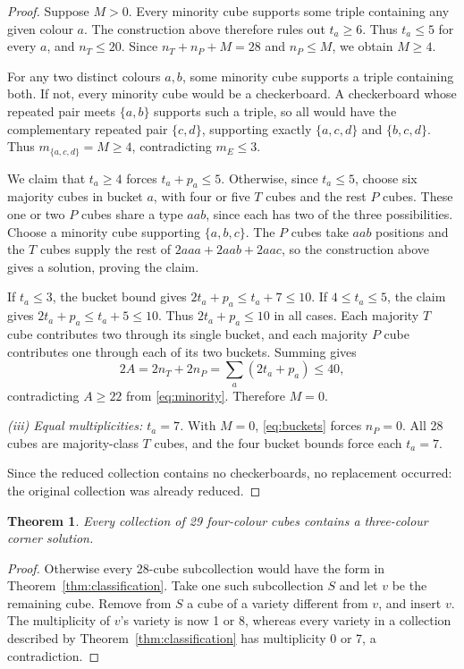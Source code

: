\documentclass[11pt]{article}
\newtheorem{theorem}{Theorem}
\theoremstyle{remark}
\begin{document}
\begin{proof}
Suppose $M>0$. Every minority cube supports some triple containing any
given colour $a$. The construction above therefore rules out $t_a\ge6$.
Thus $t_a\le5$ for every $a$, and $n_T\le20$. Since
$n_T+n_P+M=28$ and $n_P\le M$, we obtain $M\ge4$.

For any two distinct colours $a,b$, some minority cube supports a triple
containing both. If not, every minority cube would be a checkerboard.
A checkerboard whose repeated pair meets $\{a,b\}$ supports such a triple,
so all would have the complementary repeated pair $\{c,d\}$,
supporting exactly $\{a,c,d\}$ and $\{b,c,d\}$. Thus
$m_{\{a,c,d\}}=M\ge4$, contradicting $m_E\le3$.

We claim that $t_a\ge4$ forces $t_a+p_a\le5$.
Otherwise, since $t_a\le5$, choose six majority cubes in bucket $a$,
with four or five $T$ cubes and the rest $P$ cubes. These one or two
$P$ cubes share a type $aab$, since each has two of the three possibilities.
Choose a minority cube supporting $\{a,b,c\}$. The $P$ cubes take $aab$
positions and the $T$ cubes supply the rest of $2aaa+2aab+2aac$,
so the construction above gives a solution, proving the claim.

If $t_a\le3$, the bucket bound gives $2t_a+p_a\le t_a+7\le10$.
If $4\le t_a\le5$, the claim gives $2t_a+p_a\le t_a+5\le10$.
Thus $2t_a+p_a\le10$ in all cases. Each majority $T$ cube contributes two
through its single bucket, and each majority $P$ cube contributes one
through each of its two buckets. Summing gives
\[
 2A=2n_T+2n_P=\sum_a(2t_a+p_a)\le40,
\]
contradicting $A\ge22$ from \eqref{eq:minority}. Therefore $M=0$.

\smallskip\noindent\emph{(iii) Equal multiplicities: $t_a=7$.}
With $M=0$, \eqref{eq:buckets} forces $n_P=0$. All 28 cubes are majority-class
$T$ cubes, and the four bucket bounds force each $t_a=7$.

Since the reduced collection contains no checkerboards, no replacement
occurred: the original collection was already reduced.
\end{proof}

\begin{theorem}\label{thm:upper}
Every collection of 29 four-colour cubes contains a three-colour corner
solution.
\end{theorem}
\begin{proof}
Otherwise every 28-cube subcollection would have the form in
Theorem~\ref{thm:classification}. Take one such subcollection $S$ and let
$v$ be the remaining cube. Remove from $S$ a cube of a variety different
from $v$, and insert $v$. The multiplicity of $v$'s variety is now 1 or 8,
whereas every variety in a collection described by
Theorem~\ref{thm:classification} has multiplicity 0 or 7, a contradiction.
\end{proof}
\end{document}
